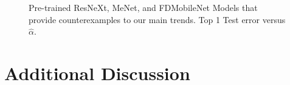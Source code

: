 {\begin{figure}[!htb]
{      \label{fig:menet-net}
   }
   \caption{
      Pre-trained 
      ResNeXt, MeNet, and FDMobileNet
      Models 
      that provide counterexamples to our main trends.
      Top 1 Test error versus
      $\hat{\alpha}$.
           }
   \label{fig:counter-examples}
\end{figure}





\section{Additional Discussion}
\label{sxn:appendix-addl-discussion}

}

